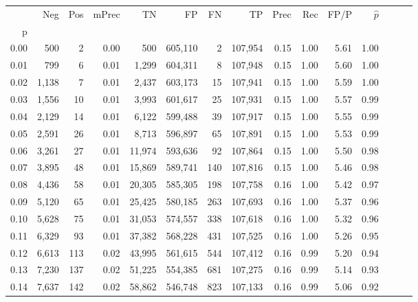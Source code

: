 \begin{tabular}{rrrrrrrrrrrrrrr}
\toprule
{} &     Neg &    Pos & mPrec &       TN &       FP &       FN &       TP &  Prec &   Rec &  FP/P & $\hat{p}$ \\
p    &         &        &       &          &          &          &          &       &       &       &           \\
\midrule
0.00 &     500 &      2 &  0.00 &      500 &  605,110 &        2 &  107,954 &  0.15 &  1.00 &  5.61 &      1.00 \\
0.01 &     799 &      6 &  0.01 &    1,299 &  604,311 &        8 &  107,948 &  0.15 &  1.00 &  5.60 &      1.00 \\
0.02 &   1,138 &      7 &  0.01 &    2,437 &  603,173 &       15 &  107,941 &  0.15 &  1.00 &  5.59 &      1.00 \\
0.03 &   1,556 &     10 &  0.01 &    3,993 &  601,617 &       25 &  107,931 &  0.15 &  1.00 &  5.57 &      0.99 \\
0.04 &   2,129 &     14 &  0.01 &    6,122 &  599,488 &       39 &  107,917 &  0.15 &  1.00 &  5.55 &      0.99 \\
0.05 &   2,591 &     26 &  0.01 &    8,713 &  596,897 &       65 &  107,891 &  0.15 &  1.00 &  5.53 &      0.99 \\
0.06 &   3,261 &     27 &  0.01 &   11,974 &  593,636 &       92 &  107,864 &  0.15 &  1.00 &  5.50 &      0.98 \\
0.07 &   3,895 &     48 &  0.01 &   15,869 &  589,741 &      140 &  107,816 &  0.15 &  1.00 &  5.46 &      0.98 \\
0.08 &   4,436 &     58 &  0.01 &   20,305 &  585,305 &      198 &  107,758 &  0.16 &  1.00 &  5.42 &      0.97 \\
0.09 &   5,120 &     65 &  0.01 &   25,425 &  580,185 &      263 &  107,693 &  0.16 &  1.00 &  5.37 &      0.96 \\
0.10 &   5,628 &     75 &  0.01 &   31,053 &  574,557 &      338 &  107,618 &  0.16 &  1.00 &  5.32 &      0.96 \\
0.11 &   6,329 &     93 &  0.01 &   37,382 &  568,228 &      431 &  107,525 &  0.16 &  1.00 &  5.26 &      0.95 \\
0.12 &   6,613 &    113 &  0.02 &   43,995 &  561,615 &      544 &  107,412 &  0.16 &  0.99 &  5.20 &      0.94 \\
0.13 &   7,230 &    137 &  0.02 &   51,225 &  554,385 &      681 &  107,275 &  0.16 &  0.99 &  5.14 &      0.93 \\
0.14 &   7,637 &    142 &  0.02 &   58,862 &  546,748 &      823 &  107,133 &  0.16 &  0.99 &  5.06 &      0.92 \\

\end{tabular}
